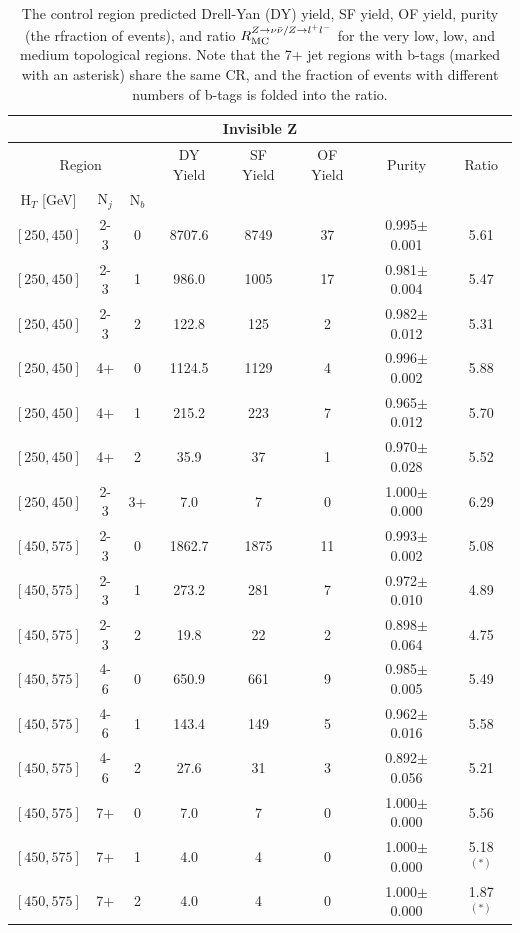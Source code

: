 \begin{table}
	\centering
	\renewcommand{\baselinestretch}{1.0}
	\caption[The control region predicted Drell-Yan (DY) yield, SF yield, OF yield, purity (the rfraction of \zll events), and ratio $R_{\mathrm{MC}}^{\znunu / \zll}$ for the very low, low, and medium \HT topological regions.]{The control region predicted Drell-Yan (DY) yield, SF yield, OF yield, purity (the rfraction of \zll events), and ratio $R_{\mathrm{MC}}^{\znunu / \zll}$ for the very low, low, and medium \HT topological regions. Note that the 7+ jet regions with b-tags (marked with an asterisk) share the same CR, and the fraction of events with different numbers of b-tags is folded into the ratio.}
	\small
	\renewcommand{\arraystretch}{1.0}
	\begin{tabular}{c|c|c|c|c|c|c|c}
\hline \hline
\multicolumn{8}{c}{Invisible Z} \\
\hline
\multicolumn{3}{c|}{Region} & DY Yield & SF Yield & OF Yield & Purity & Ratio\\
$\text{H}_{T}$ [GeV] & $\text{N}_{j}$ & $\text{N}_{b}$ & & & &  \\
\hline
$[250,450]$ &2-3&0&8707.6&8749&37&0.995$\pm$0.001&5.61\\
$[250,450]$ &2-3&1&986.0&1005&17&0.981$\pm$0.004&5.47\\
$[250,450]$ &2-3&2&122.8&125&2&0.982$\pm$0.012&5.31\\
$[250,450]$ &4+&0&1124.5&1129&4&0.996$\pm$0.002&5.88\\
$[250,450]$ &4+&1&215.2&223&7&0.965$\pm$0.012&5.70\\
$[250,450]$ &4+&2&35.9&37&1&0.970$\pm$0.028&5.52\\
$[250,450]$ &2-3&3+&7.0&7&0&1.000$\pm$0.000&6.29\\
$[450,575]$ &2-3&0&1862.7&1875&11&0.993$\pm$0.002&5.08\\
$[450,575]$ &2-3&1&273.2&281&7&0.972$\pm$0.010&4.89\\
$[450,575]$ &2-3&2&19.8&22&2&0.898$\pm$0.064&4.75\\
$[450,575]$ &4-6&0&650.9&661&9&0.985$\pm$0.005&5.49\\
$[450,575]$ &4-6&1&143.4&149&5&0.962$\pm$0.016&5.58\\
$[450,575]$ &4-6&2&27.6&31&3&0.892$\pm$0.056&5.21\\
$[450,575]$ &7+&0&7.0&7&0&1.000$\pm$0.000&5.56\\
$[450,575]$ &7+&1&4.0&4&0&1.000$\pm$0.000&5.18$^{(*)}$\\
$[450,575]$ &7+&2&4.0&4&0&1.000$\pm$0.000&1.87$^{(*)}$\\

\end{tabular}
\end{table}
